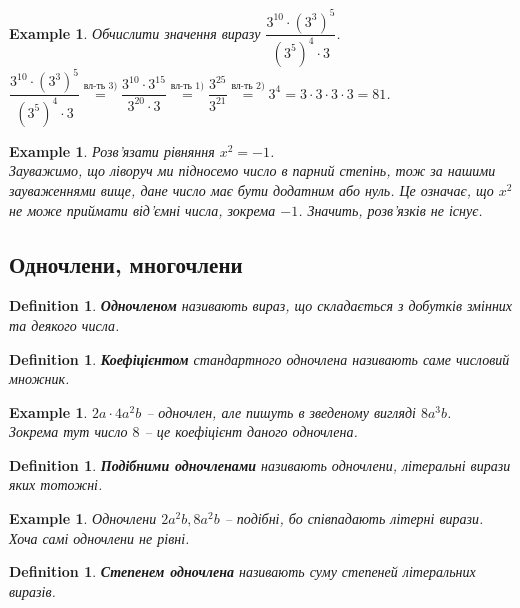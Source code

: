 \documentclass[a4paper, 10pt]{article}
\theoremstyle{theoremdd}
\theoremstyle{theoremdd}
\newtheorem{definition}[theorem]{Definition}
\theoremstyle{theoremdd}
\theoremstyle{theoremdd}
\newtheorem{example}[theorem]{Example}
\theoremstyle{theoremdd}
\theoremstyle{theoremdd}
\theoremstyle{theoremdd}
\theoremstyle{theoremdd}
\begin{document}
\begin{example}
Обчислити значення виразу $\dfrac{3^{10} \cdot (3^3)^5}{(3^5)^4 \cdot 3}$.\\
$\dfrac{3^{10} \cdot (3^3)^5}{(3^5)^4 \cdot 3} \overset{\text{вл-ть 3)}}{=} \dfrac{3^{10} \cdot 3^{15}}{3^{20} \cdot 3} \overset{\text{вл-ть 1)}}{=} \dfrac{3^{25}}{3^{21}} \overset{\text{вл-ть 2)}}{=} 3^{4} = 3 \cdot 3 \cdot 3 \cdot 3 = 81$.
\end{example}

\begin{example}
Розв'язати рівняння $x^2 = -1$.\\
Зауважимо, що ліворуч ми підносемо число в парний степінь, тож за нашими зауваженнями вище, дане число має бути додатним або нуль. Це означає, що $x^2$ не може приймати від'ємні числа, зокрема $-1$. Значить, розв'язків не існує.
\end{example}

\subsection{Одночлени, многочлени}
\begin{definition}
\textbf{Одночленом} називають вираз, що складається з добутків змінних та деякого числа.
\end{definition}

\begin{definition}
\textbf{Коефіцієнтом} стандартного одночлена називають саме числовий множник.
\end{definition}

\begin{example}
$2 a \cdot 4 a^2 b$ -- одночлен, але пишуть в зведеному вигляді $8a^3b$.\\
Зокрема тут число $8$ -- це коефіцієнт даного одночлена.
\end{example}

\begin{definition}
\textbf{Подібними одночленами} називають одночлени, літеральні вирази яких тотожні.
\end{definition}

\begin{example}
Одночлени $2a^2b, 8a^2b$ -- подібні, бо співпадають літерні вирази. Хоча самі одночлени не рівні.
\end{example}

\begin{definition}
\textbf{Степенем одночлена} називають суму степеней літеральних виразів.
\end{definition}
\end{document}
